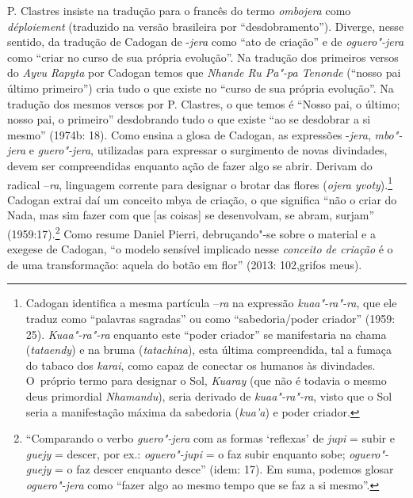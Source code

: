 P. Clastres insiste na tradução para o francês do termo \emph{ombojera} como
\emph{déploiement} (traduzido na versão brasileira por ``desdobramento'').
Diverge, nesse sentido, da tradução de Cadogan de -\emph{jera} como ``ato de
criação'' e de \emph{oguero"-jera} como ``criar no curso de sua própria
evolução''. Na tradução dos primeiros versos do \emph{Ayvu Rapyta} por Cadogan
temos que \emph{Nhande Ru Pa"-pa Tenonde} (``nosso pai último primeiro'') cria
tudo o que existe no ``curso de sua própria evolução''. Na tradução dos
mesmos versos por P. Clastres, o que temos é ``Nosso pai, o último;
nosso pai, o primeiro'' desdobrando tudo o que existe ``ao se desdobrar a
si mesmo'' (1974b: 18). Como ensina a glosa de Cadogan, as expressões
-\emph{jera}, \emph{mbo"-jera} e \emph{guero"-jera}, utilizadas para expressar o surgimento de
novas divindades, devem ser compreendidas enquanto ação de fazer algo
se abrir. Derivam do radical --\emph{ra}, linguagem corrente para designar o
brotar das flores (\emph{ojera yvoty}).\footnote{Cadogan identifica a mesma
partícula --\emph{ra} na expressão \emph{kuaa"-ra"-ra}, que ele traduz como ``palavras
sagradas'' ou como ``sabedoria/poder criador'' (1959: 25). \emph{Kuaa"-ra"-ra}
enquanto este ``poder criador'' se manifestaria na chama (\emph{tataendy}) e na
bruma (\emph{tatachina}), esta última compreendida, tal a fumaça do tabaco dos
\emph{karai}, como capaz de conectar os humanos às divindades. O~próprio termo
para designar o Sol, \emph{Kuaray} (que não é todavia o mesmo deus primordial
\emph{Nhamandu}), seria derivado de \emph{kuaa"-ra"-ra}, visto que o Sol seria a
manifestação máxima da sabedoria (\emph{kua’a}) e poder criador.  } Cadogan
extrai daí um conceito mbya de criação, o que significa ``não o criar do
Nada, mas sim fazer com que [as coisas] se desenvolvam, se abram,
surjam'' (1959:17).\footnote{``Comparando o verbo \emph{guero"-jera} com as
formas ‘reflexas’ de \emph{jupi} = subir e \emph{guejy} = descer, por ex.:
\emph{oguero"-jupi} = o faz subir enquanto sobe; \emph{oguero"-guejy} = o faz descer
enquanto desce'' (idem: 17). Em suma, podemos glosar \emph{oguero"-jera} como
``fazer algo ao mesmo tempo que se faz a si mesmo''.} Como resume Daniel
Pierri, debruçando"-se sobre o material e a exegese de Cadogan, ``o
modelo sensível implicado nesse \emph{conceito de criação} é o de uma
transformação: aquela do botão em flor'' (2013: 102,grifos meus). 

